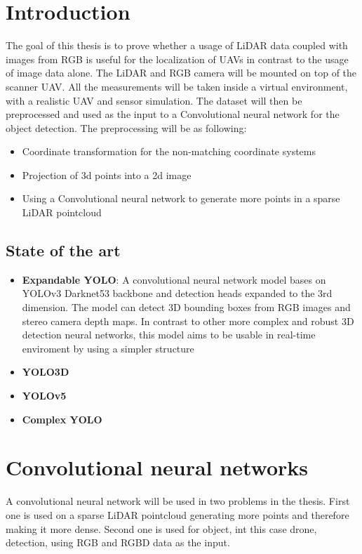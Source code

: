 \documentclass[twoside]{ctuthesis}
\theoremstyle{plain}
\theoremstyle{definition}
\theoremstyle{note}
\begin{document}
\maketitle
\chapter{Introduction}
The goal of this thesis is to prove whether a usage of LiDAR data coupled with images from RGB is useful for the localization of UAVs in contrast to the usage of image data alone. The LiDAR and RGB camera will be mounted on top of the scanner UAV. All the measurements will be taken inside a virtual environment, with a realistic UAV and sensor simulation. The dataset will then be preprocessed and used as the input to a Convolutional neural network for the object detection. The preprocessing will be as following:
\begin{itemize}
	\item Coordinate transformation for the non-matching coordinate systems
	\item Projection of 3d points into a 2d image
	\item Using a Convolutional neural network to generate more points in a sparse LiDAR pointcloud
\end{itemize}
\section{State of the art}
\begin{itemize}
	\item \textbf{Expandable YOLO}: A convolutional neural network model bases on YOLOv3 Darknet53 backbone and detection heads expanded to the 3rd dimension. The model can detect 3D bounding boxes from RGB images and stereo camera depth maps. In contrast to other more complex and robust 3D detection neural networks, this model aims to be usable in real-time enviroment by using a simpler structure
	\item \textbf{YOLO3D}
	\item \textbf{YOLOv5}
	\item \textbf{Complex YOLO}
\end{itemize}
\chapter{Convolutional neural networks}
A convolutional neural network will be used in two problems in the thesis. First one is used on a sparse LiDAR pointcloud generating more points and therefore making it more dense. Second one is used for object, int this case drone, detection, using RGB and RGBD data as the input.
\end{document}
